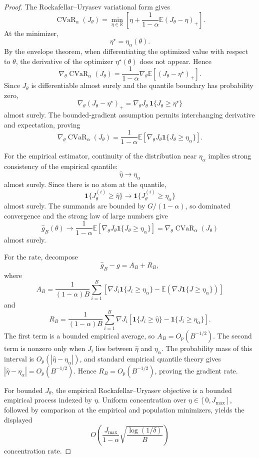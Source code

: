 \begin{proof}
The Rockafellar--Uryasev variational form gives
\[
    \operatorname{CVaR}_\alpha(J_\theta)
    =
    \min_{\eta\in\mathbb R}
    \left[
    \eta+
    \frac{1}{1-\alpha}\mathbb E(J_\theta-\eta)_+
    \right].
\]
At the minimizer,
\[
    \eta^\star=\eta_\alpha(\theta).
\]
By the envelope theorem, when differentiating the optimized value with respect to
\(\theta\), the derivative of the optimizer \(\eta^\star(\theta)\) does not appear. Hence
\[
    \nabla_\theta \operatorname{CVaR}_\alpha(J_\theta)
    =
    \frac{1}{1-\alpha}
    \nabla_\theta
    \mathbb E[(J_\theta-\eta^\star)_+].
\]
Since \(J_\theta\) is differentiable almost surely and the quantile boundary has
probability zero,
\[
    \nabla_\theta(J_\theta-\eta^\star)_+
    =
    \nabla_\theta J_\theta\,
    \mathbf 1\{J_\theta\ge \eta^\star\}
\]
almost surely. The bounded-gradient assumption permits interchanging derivative and
expectation, proving
\[
    \nabla_\theta \operatorname{CVaR}_\alpha(J_\theta)
    =
    \frac{1}{1-\alpha}
    \mathbb E
    \left[
    \nabla_\theta J_\theta
    \mathbf 1\{J_\theta\ge \eta_\alpha\}
    \right].
\]

For the empirical estimator, continuity of the distribution near \(\eta_\alpha\) implies
strong consistency of the empirical quantile:
\[
    \widehat \eta \to \eta_\alpha
\]
almost surely. Since there is no atom at the quantile,
\[
    \mathbf 1\{J_\theta^{(i)}\ge\widehat\eta\}
    \to
    \mathbf 1\{J_\theta^{(i)}\ge\eta_\alpha\}
\]
almost surely. The summands are bounded by \(G/(1-\alpha)\), so dominated
convergence and the strong law of large numbers give
\[
    \widehat g_B(\theta)
    \to
    \frac{1}{1-\alpha}
    \mathbb E
    \left[
    \nabla_\theta J_\theta
    \mathbf 1\{J_\theta\ge\eta_\alpha\}
    \right]
    =
    \nabla_\theta \operatorname{CVaR}_\alpha(J_\theta)
\]
almost surely.

For the rate, decompose
\[
    \widehat g_B-g
    =
    A_B+R_B,
\]
where
\[
    A_B
    =
    \frac{1}{(1-\alpha)B}
    \sum_{i=1}^B
    \left[
    \nabla J_i\mathbf 1\{J_i\ge\eta_\alpha\}
    -
    \mathbb E(\nabla J\mathbf 1\{J\ge\eta_\alpha\})
    \right]
\]
and
\[
    R_B
    =
    \frac{1}{(1-\alpha)B}
    \sum_{i=1}^B
    \nabla J_i
    \left[
    \mathbf 1\{J_i\ge\widehat\eta\}
    -
    \mathbf 1\{J_i\ge\eta_\alpha\}
    \right].
\]
The first term is a bounded empirical average, so \(A_B=O_p(B^{-1/2})\). The
second term is nonzero only when \(J_i\) lies between \(\widehat\eta\) and
\(\eta_\alpha\). The probability mass of this interval is
\(O_p(|\widehat\eta-\eta_\alpha|)\), and standard empirical quantile theory gives
\(|\widehat\eta-\eta_\alpha|=O_p(B^{-1/2})\). Hence \(R_B=O_p(B^{-1/2})\), proving
the gradient rate.

For bounded \(J_\theta\), the empirical Rockafellar--Uryasev objective is a bounded
empirical process indexed by \(\eta\). Uniform concentration over
\(\eta\in[0,J_{\max}]\), followed by comparison at the empirical and population
minimizers, yields the displayed
\[
    O\!\left(
    \frac{J_{\max}}{1-\alpha}
    \sqrt{\frac{\log(1/\delta)}{B}}
    \right)
\]
concentration rate.
\end{proof}

